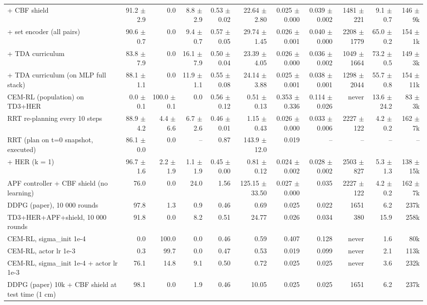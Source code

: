 \begin{table}[t]
\begin{tabular}{lrrrrrrrrrr}
+ CBF shield & 91.2 $\pm$ 2.9 & 0.0 & 8.8 $\pm$ 2.9 & 0.53 $\pm$ 0.02 & 22.64 $\pm$ 2.80 & 0.025 $\pm$ 0.000 & 0.039 $\pm$ 0.002 & 1481 $\pm$ 221 & 9.1 $\pm$ 0.7 & 146 $\pm$ 9k \\
+ set encoder (all pairs) & 90.6 $\pm$ 0.7 & 0.0 & 9.4 $\pm$ 0.7 & 0.57 $\pm$ 0.05 & 29.74 $\pm$ 1.45 & 0.026 $\pm$ 0.001 & 0.040 $\pm$ 0.000 & 2208 $\pm$ 1779 & 65.0 $\pm$ 0.2 & 154 $\pm$ 1k \\
+ TDA curriculum & 83.8 $\pm$ 7.9 & 0.0 & 16.1 $\pm$ 7.9 & 0.50 $\pm$ 0.04 & 23.39 $\pm$ 4.05 & 0.026 $\pm$ 0.000 & 0.036 $\pm$ 0.002 & 1049 $\pm$ 1664 & 73.2 $\pm$ 0.5 & 149 $\pm$ 3k \\
+ TDA curriculum (on MLP full stack) & 88.1 $\pm$ 1.1 & 0.0 & 11.9 $\pm$ 1.1 & 0.55 $\pm$ 0.08 & 24.14 $\pm$ 3.88 & 0.025 $\pm$ 0.001 & 0.038 $\pm$ 0.001 & 1298 $\pm$ 2044 & 55.7 $\pm$ 0.8 & 154 $\pm$ 11k \\
CEM-RL (population) on TD3+HER & 0.0 $\pm$ 0.1 & 100.0 $\pm$ 0.1 & 0.0 & 0.56 $\pm$ 0.12 & 0.51 $\pm$ 0.13 & 0.353 $\pm$ 0.336 & 0.114 $\pm$ 0.026 & never & 13.6 $\pm$ 24.2 & 83 $\pm$ 3k \\
RRT re-planning every 10 steps & 88.9 $\pm$ 4.2 & 4.4 $\pm$ 6.6 & 6.7 $\pm$ 2.6 & 0.46 $\pm$ 0.01 & 1.15 $\pm$ 0.43 & 0.026 $\pm$ 0.000 & 0.033 $\pm$ 0.006 & 2227 $\pm$ 122 & 4.2 $\pm$ 0.2 & 162 $\pm$ 7k \\
RRT (plan on t=0 snapshot, executed) & 86.1 $\pm$ 0.0 & 0.0 & -- & 0.87 & 143.9 $\pm$ 12.0 & 0.019 & -- & -- & -- & -- \\
+ HER (k = 1) & 96.7 $\pm$ 1.6 & 2.2 $\pm$ 1.9 & 1.1 $\pm$ 1.9 & 0.45 $\pm$ 0.00 & 0.81 $\pm$ 0.12 & 0.024 $\pm$ 0.002 & 0.028 $\pm$ 0.002 & 2503 $\pm$ 827 & 5.3 $\pm$ 1.3 & 138 $\pm$ 15k \\
APF controller + CBF shield (no learning) & 76.0 & 0.0 & 24.0 & 1.56 & 125.15 $\pm$ 33.50 & 0.027 $\pm$ 0.000 & 0.035 & 2227 $\pm$ 122 & 4.2 $\pm$ 0.2 & 162 $\pm$ 7k \\
DDPG (paper), 10 000 rounds & 97.8 & 1.3 & 0.9 & 0.46 & 0.69 & 0.025 & 0.022 & 1651 & 6.2 & 237k \\
TD3+HER+APF+shield, 10 000 rounds & 91.8 & 0.0 & 8.2 & 0.51 & 24.77 & 0.026 & 0.034 & 380 & 15.9 & 258k \\
CEM-RL, sigma\_init 1e-4 & 0.0 & 100.0 & 0.0 & 0.46 & 0.59 & 0.407 & 0.128 & never & 1.6 & 80k \\
CEM-RL, actor lr 1e-3 & 0.3 & 99.7 & 0.0 & 0.47 & 0.53 & 0.019 & 0.099 & never & 2.1 & 113k \\
CEM-RL, sigma\_init 1e-4 + actor lr 1e-3 & 76.1 & 14.8 & 9.1 & 0.50 & 0.72 & 0.025 & 0.025 & never & 3.6 & 232k \\
DDPG (paper) 10k + CBF shield at test time (1 cm) & 98.1 & 0.0 & 1.9 & 0.46 & 10.05 & 0.025 & 0.025 & 1651 & 6.2 & 237k \\
\bottomrule
\end{tabular}
\end{table}